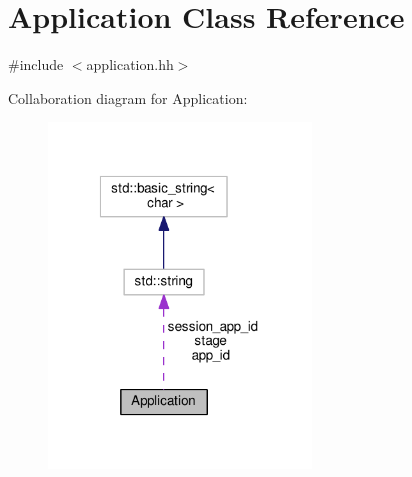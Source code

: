 \hypertarget{classApplication}{\section{Application Class Reference}
\label{classApplication}
}


{\ttfamily \#include $<$application.\-hh$>$}



Collaboration diagram for Application\-:\nopagebreak
\begin{figure}[H]
\begin{center}
\leavevmode
\includegraphics[width=198pt]{classApplication__coll__graph}
\end{center}
\end{figure}
